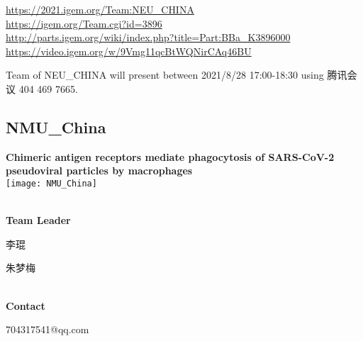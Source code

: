 \url{https://2021.igem.org/Team:NEU\_CHINA }\\
\url{https://igem.org/Team.cgi?id=3896 }\\
\url{http://parts.igem.org/wiki/index.php?title=Part:BBa_K3896000 }\\
\url{https://video.igem.org/w/9Vmg11qcBtWQNirCAq46BU }\\

\vfill{}









Team of NEU\_CHINA will present between        2021/8/28 17:00-18:30 using 腾讯会议 404 469 7665.
\newpage


\subsection{\textcolor{Blu}{ NMU\_China } }
\vspace{5mm}
\begin{center}
\large{
  \textbf{ Chimeric antigen receptors mediate phagocytosis of SARS-CoV-2 pseudoviral particles by macrophages }\\

  \texttt{[image: NMU\_China]}
}
\end{center}
\textbf{\\Team Leader}

  李琨

  朱梦梅


\textbf{\\Contact}

  704317541@qq.com


